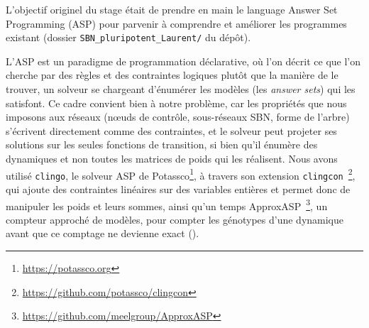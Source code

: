 \documentclass[12pt, a4paper]{article}
\begin{document}
L'objectif originel du stage était de prendre en main le language Answer Set Programming (ASP) pour parvenir à comprendre et améliorer les programmes existant (dossier \texttt{SBN\_pluripotent\_Laurent/} du dépôt).

L'ASP est un paradigme de programmation déclarative, où l'on décrit ce que l'on cherche par des règles et des contraintes logiques plutôt que la manière de le trouver, un solveur se chargeant d'énumérer les modèles (les \emph{answer sets}) qui les satisfont.
Ce cadre convient bien à notre problème, car les propriétés que nous imposons aux réseaux (nœuds de contrôle, sous-réseaux SBN, forme de l'arbre) s'écrivent directement comme des contraintes, et le solveur peut projeter ses solutions sur les seules fonctions de transition, si bien qu'il énumère des dynamiques et non toutes les matrices de poids qui les réalisent.
Nous avons utilisé \texttt{clingo}, le solveur ASP de Potassco\footnote{\url{https://potassco.org}}, à travers son extension \texttt{clingcon}~\cite{banbara2017}\footnote{\url{https://github.com/potassco/clingcon}}, qui ajoute des contraintes linéaires sur des variables entières et permet donc de manipuler les poids et leurs sommes, ainsi qu'un temps ApproxASP~\cite{kabir2022}\footnote{\url{https://github.com/meelgroup/ApproxASP}}, un compteur approché de modèles, pour compter les génotypes d'une dynamique avant que ce comptage ne devienne exact ().
\end{document}
